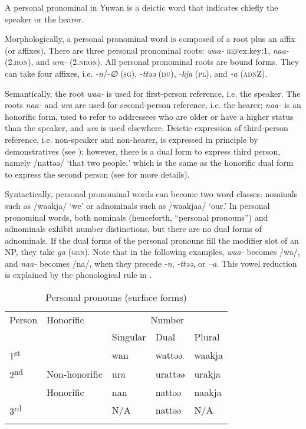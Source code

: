 A personal pronominal in Yuwan is a deictic word that indicates chiefly the speaker or the hearer.

Morphologically, a personal pronominal word is composed of a root plus an affix (or affixes). There are three personal pronominal roots: \textit{waa-} \textsc{ref}{ex:key:1}, \textit{naa-} (2.\textsc{hon}), and \textit{ura-} (2.\textsc{nhon}). All personal pronominal roots are bound forms. They can take four affixes, i.e. \textit{{}-n}/\textit{{}-∅} (\textsc{sg}), \textit{{}-ttəə} (\textsc{du}), \textit{{}-kja} (\textsc{pl}), and \textit{{}-a} (\textsc{adn}Z).

Semantically, the root \textit{waa-} is used for first-person reference, i.e. the speaker. The roots \textit{naa-} and \textit{ura} are used for second-person reference, i.e. the hearer; \textit{naa-} is an honorific form, used to refer to addressees who are older or have a higher status than the speaker, and \textit{ura} is used elsewhere. Deictic expression of third-person reference, i.e. non-speaker and non-hearer, is expressed in principle by demonstratives (see ); however, there is a dual form to express third person, namely /nattəə/ ‘that two people,’ which is the same as the honorific dual form to express the second person (see  for more details).

Syntactically, personal pronominal words can become two word classes: nominals such as /waakja/ ‘we’ or adnominals such as /waakjaa/ ‘our.’ In personal pronominal words, both nominals (henceforth, “personal pronouns”) and adnominals exhibit number distinctions, but there are no dual forms of adnominals. If the dual forms of the personal pronouns fill the modifier slot of an NP, they take \textit{ga} (\textsc{gen}). Note that in the following examples, \textit{waa-} becomes /wa/, and \textit{naa-} becomes /na/, when they precede \textit{{}-n}, \textit{{}-ttəə}, or \textit{–a}. This vowel reduction is explained by the phonological rule in .

\begin{table}
\caption{\label{tab:key:31}Personal pronouns (surface forms)}
\begin{tabular}{lllll}
\lsptoprule
Person & Honorific & \multicolumn{3}{c}{Number}\\\cmidrule(lr){3-5}
       &           &  Singular & Dual & Plural\\\midrule
1\textsuperscript{st}  &                & wan   & wattəə  & waakja\\
2\textsuperscript{nd}  &  Non-honorific & ura   & urattəə & urakja\\
                       &  Honorific     & nan   & nattəə  & naakja\\
3\textsuperscript{rd}  &                & N/A   & nattəə  & N/A   \\
\lspbottomrule
\end{tabular}
\end{table}

